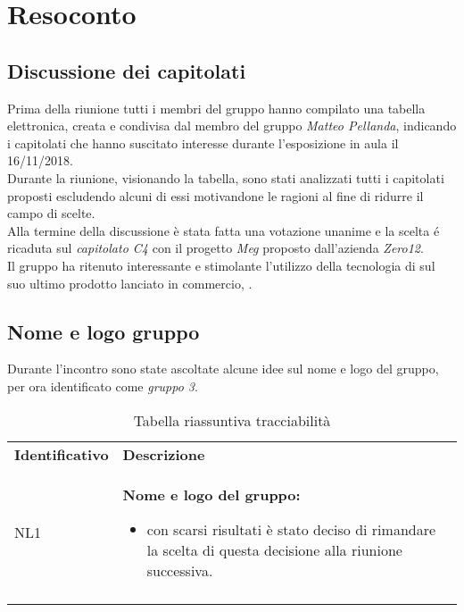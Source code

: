 \clearpage
\section{Resoconto}
\subsection{Discussione dei capitolati}
	Prima della riunione tutti i membri del gruppo hanno compilato una tabella elettronica, creata e condivisa dal membro del gruppo \emph{Matteo Pellanda}, indicando i capitolati che hanno suscitato interesse durante l'esposizione in aula il 16/11/2018. \\
	Durante la  riunione, visionando la tabella, sono stati analizzati tutti  i  capitolati proposti escludendo alcuni di essi motivandone le ragioni al fine di ridurre il campo di scelte. \\
	Alla termine della discussione è stata fatta una votazione unanime e la scelta é ricaduta sul \emph{capitolato C4} con il progetto \emph{Meg} proposto dall’azienda \emph{Zero12}. \\ 
	Il gruppo ha ritenuto interessante e stimolante l’utilizzo della tecnologia  di  sul suo ultimo prodotto lanciato in commercio,  .
	
	\subsection{Nome e logo gruppo}
	Durante l'incontro sono state ascoltate alcune idee sul nome e logo del gruppo, per ora identificato come \emph{gruppo 3}.
		\begin{center}
			\renewcommand{\arraystretch}{1.5}
			\begin{longtable}{  p{3cm} p{11.2cm}  }
				\rowcolor{tableHeadYellow}
				\textbf{Identificativo} & \textbf{Descrizione}\\
				NL1 & 	 	\textbf{Nome e logo del gruppo:}
				\begin{itemize}
					\item con scarsi risultati è stato deciso di rimandare la scelta di questa decisione alla riunione successiva.
				\end{itemize}
				\\					
				\rowcolor{white}
				\caption{Tabella riassuntiva tracciabilità}
			\end{longtable}	
		\end{center}
	\clearpage
